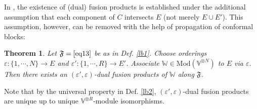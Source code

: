 \documentclass[11pt,b5paper,notitlepage]{article}
\theoremstyle{definition}
\theoremstyle{plain}
\newtheorem{thm}[df]{Theorem}
\newcommand{\Vbb}{\mathbb V}
\newcommand{\Wbb}{\mathbb W}
\newcommand{\<}{\left\langle}
\renewcommand{\>}{\right\rangle}
\newcommand{\Mod}{\mathrm{Mod}}
\newcommand{\eps}{\varepsilon}
\newcommand{\ff}{\mathfrak{F}}
\numberwithin{equation}{section}
\begin{document}
In \cite{GZ1}, the existence of (dual) fusion products is established under the additional assumption that each component of $C$ intersects $E$ (not merely $E\cup E'$). This assumption, however, can be removed with the help of propagation of conformal blocks:


\begin{thm}\label{lb3}
Let $\ff=\eqref{eq13}$ be as in Def. \ref{lb1}. Choose orderings $\eps:\{1,\cdots,N\}\rightarrow E$ and $\eps':\{1,\cdots ,R\}\rightarrow E'$. Associate $\Wbb\in\Mod(\Vbb^{\otimes N})$ to $E$ via $\eps$. Then there exists an $(\eps',\eps)$-dual fusion products of $\Wbb$ along $\ff$.
\end{thm}

Note that by the universal property in Def. \ref{lb2}, $(\eps',\eps)$-dual fusion products are unique up to unique $\Vbb^{\otimes R}$-module isomorphisms. 
\end{document}
